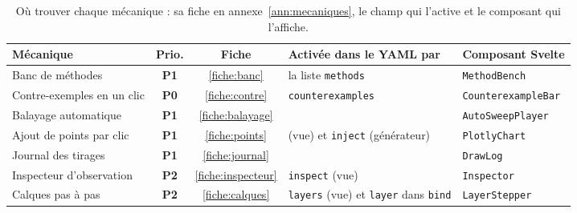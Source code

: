 \documentclass[11pt,a4paper]{article}
\newcommand{\pzero}{\colorbox{ctCorrection!18}{\footnotesize\textbf{P0}}}
\newcommand{\pone}{\colorbox{ctMethod!18}{\footnotesize\textbf{P1}}}
\newcommand{\ptwo}{\colorbox{ctBaseline!18}{\footnotesize\textbf{P2}}}
\begin{document}
\begin{table}[H]
  \centering
  \small
  \begin{tabularx}{\textwidth}{@{}L{3.9cm} c c Y L{3.4cm}@{}}
    \toprule
    \textbf{Mécanique} & \textbf{Prio.} & \textbf{Fiche} & \textbf{Activée dans le YAML par} & \textbf{Composant Svelte} \\
    \midrule
    Banc de méthodes & \pone & \ref{fiche:banc} & la liste \texttt{methods} & \texttt{MethodBench} \\
    Contre-exemples en un clic & \pzero & \ref{fiche:contre} & \texttt{counterexamples} & \texttt{CounterexampleBar} \\
    Balayage automatique & \pone & \ref{fiche:balayage} &  & \texttt{AutoSweepPlayer} \\
    Ajout de points par clic & \pone & \ref{fiche:points} &  (vue) et \texttt{inject} (générateur) & \texttt{PlotlyChart} \\
    Journal des tirages & \pone & \ref{fiche:journal} &  & \texttt{DrawLog} \\
    Inspecteur d'observation & \ptwo & \ref{fiche:inspecteur} & \texttt{inspect} (vue) & \texttt{Inspector} \\
    Calques pas à pas & \ptwo & \ref{fiche:calques} & \texttt{layers} (vue) et \texttt{layer} dans \texttt{bind} & \texttt{LayerStepper} \\
    \bottomrule
  \end{tabularx}
  \caption{Où trouver chaque mécanique : sa fiche en annexe~\ref{ann:mecaniques}, le champ qui l'active et le composant qui l'affiche.}
\end{table}
\end{document}
